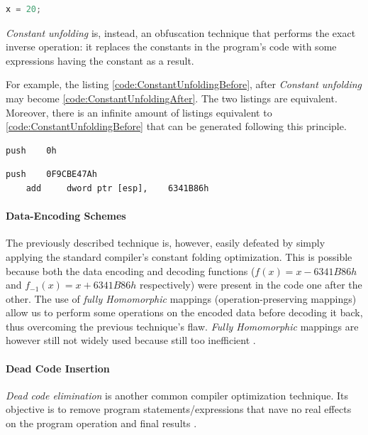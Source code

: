 \documentclass[pdfa%
,cucitura%
]{toptesi}
\begin{document}
\begin{lstlisting}[caption={After constant folding}, label=code:ConstantFoldingAfter, language=C, style=mystyle]
	x = 20;
\end{lstlisting}

\textit{Constant unfolding} is, instead, an obfuscation technique that performs the exact inverse operation: it replaces the constants in the program's code with some expressions having the constant as a result.

For example, the listing \ref{code:ConstantUnfoldingBefore}, after \textit{Constant unfolding} may become \ref{code:ConstantUnfoldingAfter}. The two listings are equivalent. Moreover, there is an infinite amount of listings equivalent to \ref{code:ConstantUnfoldingBefore} that can be generated following this principle.
\begin{lstlisting}[caption={Before constant unfolding}, label=code:ConstantUnfoldingBefore, language={[x86masm]Assembler}, style=mystyle]
	push	0h
\end{lstlisting}

\begin{lstlisting}[caption={After constant unfolding}, label=code:ConstantUnfoldingAfter, language={[x86masm]Assembler}, style=mystyle]
	push	0F9CBE47Ah
	add		dword ptr [esp],	6341B86h
\end{lstlisting}

\paragraph{Data-Encoding Schemes}
The previously described technique is, however, easily defeated by simply applying the standard compiler's constant folding optimization. This is possible because both the data encoding and decoding functions ($f(x)=x-6341B86h$ and $f_{-1}(x)=x+6341B86h$ respectively) were present in the code one after the other. The use of \textit{fully Homomorphic} mappings (operation-preserving mappings) allow us to perform some operations on the encoded data before decoding it back, thus overcoming the previous technique's flaw. \textit{Fully Homomorphic} mappings are however still not widely used because still too inefficient \cite{DangPRE}.

\paragraph{Dead Code Insertion}
\textit{Dead code elimination} is another common compiler optimization technique. Its objective is to remove program statements/expressions that nave no real effects on the program operation and final results \cite{DangPRE}.
\end{document}
